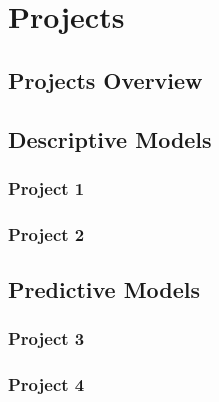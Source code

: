 \part{Projects\label{part:projects}}

\chapter{Projects Overview}
    \lipsum[1-4]
    \clearpage{\pagestyle{empty}\cleardoublepage}  %

\chapter{Descriptive Models\label{ch:descriptive_models}}
    
    \section{Project 1\label{prj:project1}}
    
    \clearpage{\pagestyle{empty}\cleardoublepage}  %
    
    \section{Project 2\label{prj:project2}}
    \clearpage{\pagestyle{empty}\cleardoublepage}  %


\chapter{Predictive Models\label{ch:predictive_models}}
    
    \section{Project 3\label{prj:project3}}
    \clearpage{\pagestyle{empty}\cleardoublepage}  %

    \section{Project 4\label{prj:project4}}
    \clearpage{\pagestyle{empty}\cleardoublepage}  %


